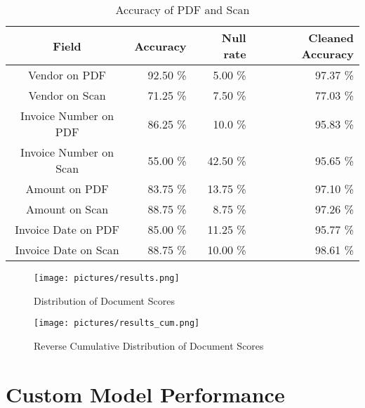 \begin{table}[ht]   %
    \centering
    \footnotesize
    \begin{tabular}{c|rrr} %
        \toprule    %
        Field  & Accuracy  & Null rate & Cleaned Accuracy \\
        \midrule    %
        Vendor on PDF    & 92.50 \%   &  5.00 \%   & 97.37 \% \\
        Vendor on Scan   & 71.25 \%   &  7.50 \%   & 77.03 \% \\
        \midrule    %
        Invoice Number on PDF & 86.25 \%   & 10.0 \%  & 95.83 \%\\
        Invoice Number on Scan & 55.00 \%  & 42.50 \%  & 95.65 \%\\
        \midrule    %
        Amount on PDF      & 83.75 \%   & 13.75 \%  & 97.10 \% \\
        Amount on Scan     & 88.75 \%   & 8.75 \%  & 97.26 \% \\
        \midrule    %
        Invoice Date on PDF  & 85.00 \%   & 11.25  \%  & 95.77 \% \\
        Invoice Date on Scan & 88.75 \%   & 10.00  \%  & 98.61 \% \\
        
        \bottomrule %
    \end{tabular}
    \caption{Accuracy of PDF and Scan}
    \label{table:Field_Com_Scan_PDF}
\end{table}

\begin{figure}[ht]
    \centering 
    \texttt{[image: pictures/results.png]}
    \caption{Distribution of Document Scores}
    \label{pic:results_1}    %
\end{figure}
\begin{figure}[ht]
    \centering 
    \texttt{[image: pictures/results\_cum.png]}
    \caption{Reverse Cumulative Distribution of Document Scores}
    \label{pic:results_1_cum}    %
\end{figure}

\section{Custom Model Performance}

